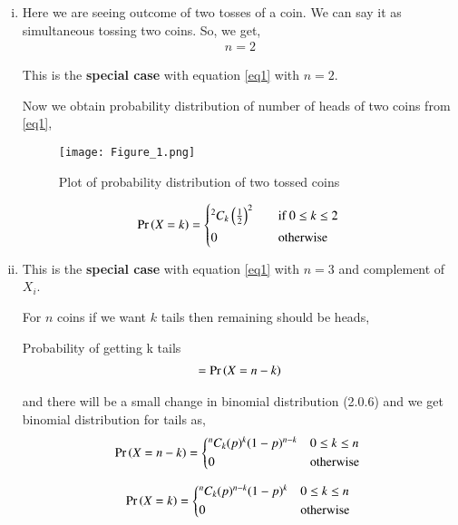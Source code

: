 \documentclass[journal,12pt,twocolumn]{IEEEtran}
\begin{document}
\begin{enumerate}[(i)]
    \item Here we are seeing outcome of two tosses of a coin. We can     say it as simultaneous tossing two coins. So, we get,
        \begin{align}
            n=2
        \end{align}

    This is the \textbf{special case} with equation \eqref{eq1} with $n=2$.

Now we obtain probability distribution of number of heads of two coins from \eqref{eq1},

\begin{figure}[h!]
    \centering
    \texttt{[image: Figure\_1.png]}
    \caption{Plot of probability distribution of two tossed coins}
    \label{fig:Two coins}
\end{figure}

\begin{align}
   \pr{X=k} =
  \begin{cases*}
    {^2 C_k}\brak{\frac{1}{2}}^{2} \quad& if $0 \leq k \leq 2$ \\
    0 \quad& otherwise
  \end{cases*}
\end{align}

\vspace{0.2in}

\item
This is the \textbf{special case} with equation \eqref{eq1} with $n=3$ and complement of $X_i$.

For $n$ coins if we want $k$ tails then remaining should be heads,

Probability of getting k tails
\begin{align}
     =\Pr\left(X=n-k\right)
\end{align}

and there will be a small change in binomial distribution (2.0.6) and we get binomial distribution for tails as,
\begin{align}
   \pr{X=n-k} =
  \begin{cases*}
    {^n C_k}(p)^{k}(1-p)^{n-k} & $0 \leq k \leq n$\\
      0 & otherwise
  \end{cases*}
\end{align}

\begin{align}\label{eq2}
   \pr{X=k} =
  \begin{cases*}
    {^n C_k}(p)^{n-k}(1-p)^{k} & $0 \leq k \leq n$\\
      0 & otherwise
  \end{cases*}
\end{align}


\end{enumerate}
\end{document}

